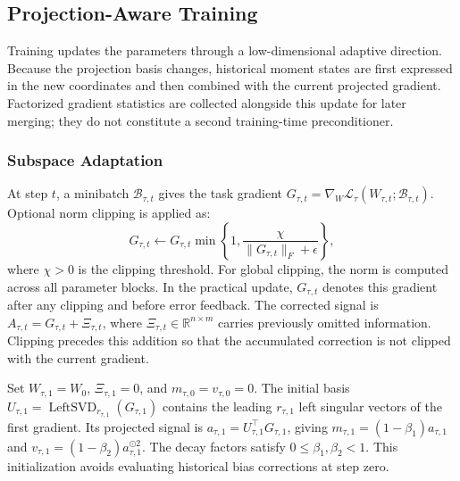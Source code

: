 \documentclass[fleqn,10pt]{wlscirep}
\begin{document}
\subsection{Projection-Aware Training}
\label{subsec:projection_aware_training}
Training updates the parameters through a low-dimensional adaptive direction. Because the projection basis changes, historical moment states are first expressed in the new coordinates and then combined with the current projected gradient. Factorized gradient statistics are collected alongside this update for later merging; they do not constitute a second training-time preconditioner.

\subsubsection{Subspace Adaptation}
\label{subsubsec:gradient_computation}
\label{subsubsec:corrected_accumulator}
\label{subsubsec:subspace_proposal}
\label{subsubsec:basis_update}
At step $t$, a minibatch $\mathcal{B}_{\tau,t}$ gives the task
gradient $G_{\tau,t}=\nabla_W\mathcal{L}_{\tau}
(W_{\tau,t};\mathcal{B}_{\tau,t})$. Optional norm clipping
is applied as:
\[
G_{\tau,t}\leftarrow G_{\tau,t}
\min\!\left\{1,\frac{\chi}{\|G_{\tau,t}\|_F+\epsilon}\right\},
\]
where $\chi>0$ is the clipping threshold. For global clipping,
the norm is computed across all parameter blocks. In the
practical update, $G_{\tau,t}$ denotes this gradient after
any clipping and before error feedback. The corrected signal
is $A_{\tau,t}=G_{\tau,t}+\Xi_{\tau,t}$, where
$\Xi_{\tau,t}\in\mathbb{R}^{n\times m}$ carries previously
omitted information. Clipping precedes this addition so that
the accumulated correction is not clipped with the current
gradient.

Set $W_{\tau,1}=W_0$, $\Xi_{\tau,1}=0$, and $m_{\tau,0}=v_{\tau,0}=0$. The initial basis $U_{\tau,1}=\operatorname{LeftSVD}_{r_{\tau,1}}(G_{\tau,1})$ contains the leading $r_{\tau,1}$ left singular vectors of the first gradient. Its projected signal is $a_{\tau,1}=U_{\tau,1}^{\top}G_{\tau,1}$, giving $m_{\tau,1}=(1-\beta_1)a_{\tau,1}$ and $v_{\tau,1}=(1-\beta_2)a_{\tau,1}^{\odot2}$. The decay factors satisfy $0\leq\beta_1,\beta_2<1$. This initialization avoids evaluating historical bias corrections at step zero.
\end{document}
